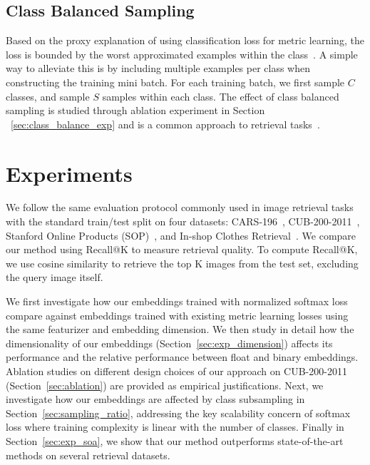 \documentclass{bmvc2k}
\begin{document}
\subsection{Class Balanced Sampling}
\label{subsec:sampling}
Based on the proxy explanation of using classification loss for metric learning, the loss is bounded by the worst approximated examples within the class~\cite{nofusslearning}. A simple way to alleviate this is by including multiple examples per class when constructing the training mini batch. For each training batch, we first sample $C$ classes, and sample $S$ samples within each class. The effect of class balanced sampling is studied through ablation experiment in Section ~\ref{sec:class_balance_exp} and is a common approach to retrieval tasks~\cite{samplingmatters, npairNIPS2016}.
 


\section{Experiments}
\label{sec:experiments}

We follow the same evaluation protocol commonly used in image retrieval tasks with the standard train/test split on four datasets: CARS-196~\cite{cars196}, CUB-200-2011~\cite{cub200}, Stanford Online Products (SOP)~\cite{songCVPR16}, and In-shop Clothes Retrieval~\cite{liu2016deepfashion}. We compare our method using Recall@K to measure retrieval quality. To compute Recall@K, we use cosine similarity to retrieve the top K images from the test set, excluding the query image itself.

We first investigate how our embeddings trained with normalized softmax loss compare against embeddings trained with existing metric learning losses using the same featurizer and embedding dimension. We then study in detail how the dimensionality of our embeddings (Section~\ref{sec:exp_dimension}) affects its performance and the relative performance between float and binary embeddings. Ablation studies on different design choices of our approach on CUB-200-2011~\cite{cub200} (Section~\ref{sec:ablation}) are provided as empirical justifications. Next, we investigate how our embeddings are affected by class subsampling in Section~\ref{sec:sampling_ratio}, addressing the key scalability concern of softmax loss where training complexity is linear with the number of classes. Finally in Section~\ref{sec:exp_soa}, we show that our method outperforms state-of-the-art methods on several retrieval datasets.
\end{document}
